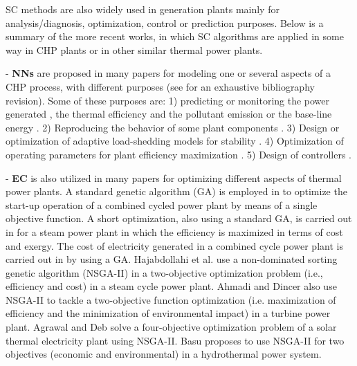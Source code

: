 SC methods are also widely used in generation plants mainly for analysis/diagnosis, optimization, control or prediction purposes. Below is a summary of the more recent works, in which SC algorithms are applied in some way in CHP plants or in other similar thermal power plants.

- \textbf{NNs} are proposed in many papers for modeling one or several aspects of a CHP process, with different purposes  (see \cite{Rossi-2014} for an exhaustive bibliography revision). Some of these purposes are: 1) predicting or monitoring the power generated \cite{De-2007,Smrekar-2010,Nikpey-2013,Sisworahardjo-2013}, the thermal efficiency and the pollutant emission \cite{Flynn-2005,Pan-2007} or the base-line energy \cite{Rossi-2014}. 2) Reproducing the behavior of some plant components \cite{Bekat-2012}. 3) Design or optimization of adaptive load-shedding models for stability \cite{Kumar-2013}. 4) Optimization of operating parameters for plant efficiency maximization \cite{Zomo-2011,Arslam-2011}. 5) Design of controllers \cite{Wang-2008,Lee-2010}.

- \textbf{EC} is also utilized in many papers for optimizing different aspects of thermal power plants. A standard genetic algorithm (GA) is employed in \cite{Bertini-12} to optimize the start-up operation of a combined cycled power plant by means of a single objective function. A short optimization, also using a standard GA, is carried out in \cite{Ameri-09} for a steam power plant in which the efficiency is maximized in terms of cost and exergy. The cost of electricity generated in a combined cycle power plant is carried out in \cite{Koch-2007} by using a GA. Hajabdollahi et al. \cite{Haja-2012} use a non-dominated sorting genetic algorithm (NSGA-II) in a two-objective optimization problem (i.e., efficiency and cost) in a steam cycle power plant. Ahmadi and Dincer \cite{Ahmadi-2011} also use NSGA-II to tackle a two-objective function optimization (i.e. maximization of efficiency and the minimization of environmental impact) in a turbine power plant. Agrawal and Deb \cite{Deb2012} solve a four-objective optimization problem of a solar thermal electricity plant using NSGA-II. Basu \cite{Basu-11} proposes to use NSGA-II for two objectives (economic and environmental) in a hydrothermal power system. 

